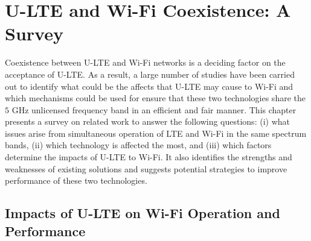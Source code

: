 %
%
%
\chapter{U-LTE and Wi-Fi Coexistence: A Survey}
\label{survey} %


Coexistence between U-LTE and Wi-Fi networks is a deciding factor on the acceptance of U-LTE. As a result, a large number of studies have been carried out to identify what could be the affects that U-LTE may cause to Wi-Fi and which mechanisms could be used for ensure that these two technologies share the $5$ GHz unlicensed frequency band in an efficient and fair manner. This chapter presents a survey on related work to answer the following questions: (i) what issues arise from simultaneous operation of LTE and Wi-Fi in the same spectrum bands, (ii) which technology is affected the most, and (iii) which factors determine the impacts of U-LTE to Wi-Fi. It also identifies the strengths and weaknesses of existing solutions and suggests potential strategies to improve performance of these two technologies.

\section{Impacts of U-LTE on Wi-Fi Operation and Performance}

